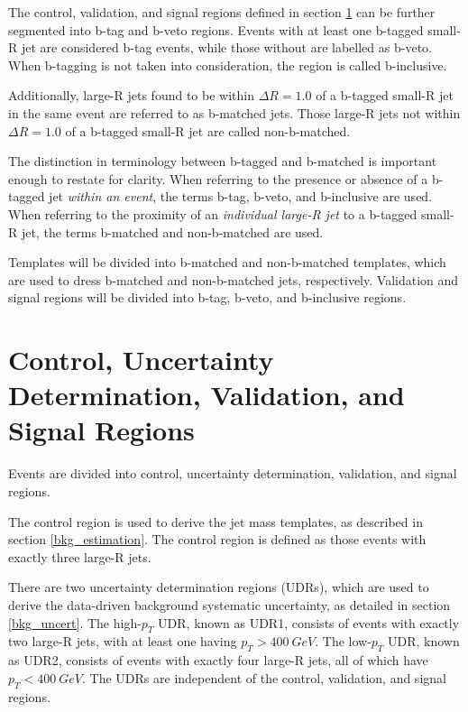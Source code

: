 The control, validation, and signal regions defined in section
\ref{region_defs} can be further segmented into b-tag and b-veto
regions. Events with at least one b-tagged small-R jet are considered
b-tag events, while those without are labelled as b-veto. When
b-tagging is not taken into consideration, the region is called
b-inclusive.

Additionally, large-R jets found to be within $\Delta R=1.0$ of a
b-tagged small-R jet in the same event are referred to as b-matched
jets. Those large-R jets not within $\Delta R=1.0$ of a b-tagged
small-R jet are called non-b-matched. 

The distinction in terminology between b-tagged and b-matched is important enough to
restate for clarity. When referring to the presence or absence of a b-tagged
jet \textit{within an event}, the terms b-tag, b-veto, and b-inclusive are used. When
referring to the proximity of an \textit{individual large-R jet} to a b-tagged
small-R jet, the terms b-matched and non-b-matched are used.

Templates will be divided into b-matched and non-b-matched templates,
which are used to dress b-matched and non-b-matched jets,
respectively. Validation and signal regions will be divided into
b-tag, b-veto, and b-inclusive regions.

\section{Control, Uncertainty Determination, Validation, and Signal Regions} \label{region_defs}
Events are divided into control, uncertainty determination,
validation, and signal regions.

The control region is used to derive the jet mass templates, as
described in section \ref{bkg_estimation}. The control region is
defined as those events with exactly three large-R jets. 

There are two uncertainty determination regions (UDRs), which are used to
derive the data-driven background systematic uncertainty, as detailed
in section \ref{bkg_uncert}. The high-$p_{T}$ UDR, known as UDR1,
consists of events with exactly two large-R jets, with at least one
having $p_{T}>400~GeV$. The low-$p_{T}$ UDR, known as UDR2, consists
of events with exactly four large-R jets, all of which have
$p_{T}<400~GeV$. The UDRs are independent of the control, validation,
and signal regions.

